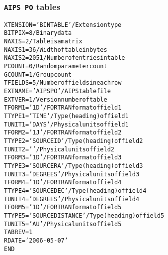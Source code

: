 \documentclass[twoside]{article}
\begin{document}
\subsubsection{{\tt AIPS PO} tables}
\label{Appe:POtable}
\begin{alltt}
XTENSION= 'BINTABLE'           / Extension type
BITPIX  =                    8 / Binary data
NAXIS   =                    2 / Table is a matrix
NAXIS1  =                   36 / Width of table in bytes
NAXIS2  =                 2051 / Number of entries in table
PCOUNT  =                    0 / Random parameter count
GCOUNT  =                    1 / Group count
TFIELDS =                    5 / Number of fields in each row
EXTNAME = 'AIPS PO '           / AIPS table file
EXTVER  =                    1 / Version number of table
TFORM1  = '1D      '           / FORTRAN format of field  1
TTYPE1  = 'TIME            '   / Type (heading) of field  1
TUNIT1  = 'DAYS    '           / Physical units of field  1
TFORM2  = '1J      '           / FORTRAN format of field  2
TTYPE2  = 'SOURCE ID       '   / Type (heading) of field  2
TUNIT2  = '        '           / Physical units of field  2
TFORM3  = '1D      '           / FORTRAN format of field  3
TTYPE3  = 'SOURCE RA       '   / Type (heading) of field  3
TUNIT3  = 'DEGREES '           / Physical units of field  3
TFORM4  = '1D      '           / FORTRAN format of field  4
TTYPE4  = 'SOURCE DEC      '   / Type (heading) of field  4
TUNIT4  = 'DEGREES '           / Physical units of field  4
TFORM5  = '1D      '           / FORTRAN format of field  5
TTYPE5  = 'SOURCE DISTANCE '   / Type (heading) of field  5
TUNIT5  = 'AU      '           / Physical units of field  5
TABREV  =            1
RDATE   = '2006-05-07'
END
\end{alltt}
\end{document}
